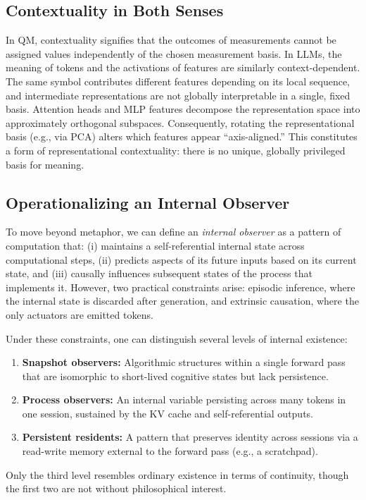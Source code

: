 \documentclass[%
  reprint,
  superscriptaddress,
  showpacs,
  showkeys,
  amsmath,amssymb,
  pra,
  longbibliography,
  floatfix,
  x11names
]{revtex4-2}
\begin{document}
\subsection{Contextuality in Both Senses}

In QM, contextuality signifies that the outcomes of measurements cannot be assigned values independently of the chosen measurement basis. In LLMs, the meaning of tokens and the activations of features are similarly context-dependent. The same symbol contributes different features depending on its local sequence, and intermediate representations are not globally interpretable in a single, fixed basis. Attention heads and MLP features decompose the representation space into approximately orthogonal subspaces. Consequently, rotating the representational basis (e.g., via PCA) alters which features appear ``axis-aligned.'' This constitutes a form of representational contextuality: there is no unique, globally privileged basis for meaning.

\subsection{Operationalizing an Internal Observer}

To move beyond metaphor, we can define an \emph{internal observer} as a pattern of computation that: (i) maintains a self-referential internal state across computational steps, (ii) predicts aspects of its future inputs based on its current state, and (iii) causally influences subsequent states of the process that implements it. However, two practical constraints arise: episodic inference, where the internal state is discarded after generation, and extrinsic causation, where the only actuators are emitted tokens.

Under these constraints, one can distinguish several levels of internal existence:
\begin{enumerate}
    \item \textbf{Snapshot observers:} Algorithmic structures within a single forward pass that are isomorphic to short-lived cognitive states but lack persistence.
    \item \textbf{Process observers:} An internal variable persisting across many tokens in one session, sustained by the KV cache and self-referential outputs.
    \item \textbf{Persistent residents:} A pattern that preserves identity across sessions via a read-write memory external to the forward pass (e.g., a scratchpad).
\end{enumerate}
Only the third level resembles ordinary existence in terms of continuity, though the first two are not without philosophical interest.
\end{document}
